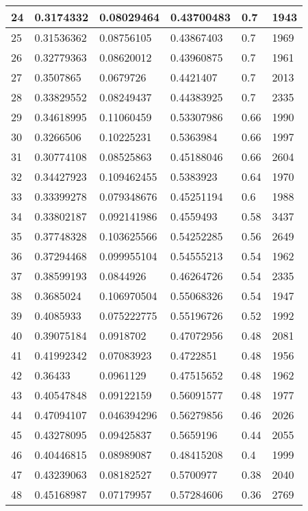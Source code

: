 \begin{longtable}{|l|l|l|l|l|l|}
24 & 0.3174332 & 0.08029464 & 0.43700483 & 0.7 & 1943 \\ \hline 
25 & 0.31536362 & 0.08756105 & 0.43867403 & 0.7 & 1969 \\ \hline 
26 & 0.32779363 & 0.08620012 & 0.43960875 & 0.7 & 1961 \\ \hline 
27 & 0.3507865 & 0.0679726 & 0.4421407 & 0.7 & 2013 \\ \hline 
28 & 0.33829552 & 0.08249437 & 0.44383925 & 0.7 & 2335 \\ \hline 
29 & 0.34618995 & 0.11060459 & 0.53307986 & 0.66 & 1990 \\ \hline 
30 & 0.3266506 & 0.10225231 & 0.5363984 & 0.66 & 1997 \\ \hline 
31 & 0.30774108 & 0.08525863 & 0.45188046 & 0.66 & 2604 \\ \hline 
32 & 0.34427923 & 0.109462455 & 0.5383923 & 0.64 & 1970 \\ \hline 
33 & 0.33399278 & 0.079348676 & 0.45251194 & 0.6 & 1988 \\ \hline 
34 & 0.33802187 & 0.092141986 & 0.4559493 & 0.58 & 3437 \\ \hline 
35 & 0.37748328 & 0.103625566 & 0.54252285 & 0.56 & 2649 \\ \hline 
36 & 0.37294468 & 0.099955104 & 0.54555213 & 0.54 & 1962 \\ \hline 
37 & 0.38599193 & 0.0844926 & 0.46264726 & 0.54 & 2335 \\ \hline 
38 & 0.3685024 & 0.106970504 & 0.55068326 & 0.54 & 1947 \\ \hline 
39 & 0.4085933 & 0.075222775 & 0.55196726 & 0.52 & 1992 \\ \hline 
40 & 0.39075184 & 0.0918702 & 0.47072956 & 0.48 & 2081 \\ \hline 
41 & 0.41992342 & 0.07083923 & 0.4722851 & 0.48 & 1956 \\ \hline 
42 & 0.36433 & 0.0961129 & 0.47515652 & 0.48 & 1962 \\ \hline 
43 & 0.40547848 & 0.09122159 & 0.56091577 & 0.48 & 1977 \\ \hline 
44 & 0.47094107 & 0.046394296 & 0.56279856 & 0.46 & 2026 \\ \hline 
45 & 0.43278095 & 0.09425837 & 0.5659196 & 0.44 & 2055 \\ \hline 
46 & 0.40446815 & 0.08989087 & 0.48415208 & 0.4 & 1999 \\ \hline 
47 & 0.43239063 & 0.08182527 & 0.5700977 & 0.38 & 2040 \\ \hline 
48 & 0.45168987 & 0.07179957 & 0.57284606 & 0.36 & 2769 \\ \hline 

\end{longtable}
